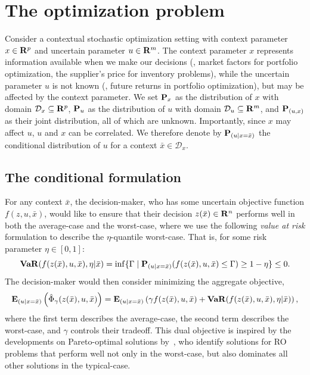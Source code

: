 \section{The optimization problem}
\label{c4:sec:intro}
Consider a contextual stochastic optimization setting with context parameter $x \in {\mathbf R}^p$ and uncertain parameter $u \in {\mathbf R}^m$. 
The context parameter $x$ represents information available when we make our decisions (\eg, market factors for portfolio optimization, the supplier's price for inventory problems), while the uncertain parameter $u$ is not known (\eg, future returns in portfolio optimization), but may be affected by the context parameter.
We set ${\mathbf P}_x$ as the distribution of $x$ with domain $\mathcal{D}_x \subseteq {\mathbf R}^p$, ${\mathbf P}_u$ as the  distribution of $u$ with domain $\mathcal{D}_u \subseteq {\mathbf R}^m$, and ${\mathbf P}_{(u, x)}$ as their joint distribution, all of which are unknown.
Importantly, since $x$ may affect $u$, $u$ and $x$ can be correlated. We therefore denote by ${\mathbf P}_{(u|x = \bar{x})}$ the conditional distribution of $u$ for a context $\bar{x} \in \mathcal{D}_x$.

\subsection{The conditional formulation}
\label{sec:cond}
For any context $\bar{x}$, the decision-maker, who has some uncertain objective function $f(z,u,\bar{x})$, would like to ensure that their decision $z(\bar{x}) \in {\mathbf R}^n$ performs well in both the average-case and the worst-case, where we use the following {\it value at risk} formulation to describe the $\eta$-quantile worst-case. That is, for some risk parameter $\eta \in [0,1]$:
\begin{equation*}
\mathop{\bf VaR}(f(z(\bar{x}),u,\bar{x}),\eta|\bar{x}) = \inf\{\Gamma \mid {\mathbf P}_{(u|x = \bar{x})}(f(z(\bar{x}),u,\bar{x}) \leq \Gamma) \geq 1-\eta\} \leq 0.
\end{equation*} 
The decision-maker would then consider minimizing the aggregate objective,
\begin{equation}
	\label{eq:performance_metric}
	\mathbf{E}_{(u|x = \bar{x})}\left(\hat{\Phi}_\gamma(z(\bar{x}),u,\bar{x})\right) = \mathbf{E}_{(u|x = \bar{x})}\left(\gamma f(z(\bar{x}),u,\bar{x}) + \mathop{\bf VaR}(f(z(\bar{x}),u,\bar{x}),\eta|\bar{x}) \right),
\end{equation} 
where the first term describes the average-case, the second term describes the worst-case, and $\gamma$ controls their tradeoff. This dual objective is inspired by the developments on Pareto-optimal solutions by~\cite{pareto}, who identify solutions for \gls{RO} problems that perform well not only in the worst-case, but also dominates all other solutions in the typical-case. 

